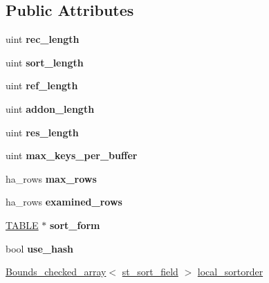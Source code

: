 \subsection*{Public Attributes}
\begin{DoxyCompactItemize}
\item 
\mbox{\label{classSort__param_a2642576c28b981c3b9ade8cbe3b7d07d}} 
uint {\bfseries rec\+\_\+length}
\item 
\mbox{\label{classSort__param_a7d595b49a79af97f33a666245dd98683}} 
uint {\bfseries sort\+\_\+length}
\item 
\mbox{\label{classSort__param_a1fa83123d9e269be4f7d8e7798087447}} 
uint {\bfseries ref\+\_\+length}
\item 
\mbox{\label{classSort__param_ae52e94af7ce910b149c9a25049d477ee}} 
uint {\bfseries addon\+\_\+length}
\item 
\mbox{\label{classSort__param_ae12b0b63f3fcd8476387cb4ce8eddd80}} 
uint {\bfseries res\+\_\+length}
\item 
\mbox{\label{classSort__param_a1f63a7f5997d4f1ac2a5d14c7b0d3ac4}} 
uint {\bfseries max\+\_\+keys\+\_\+per\+\_\+buffer}
\item 
\mbox{\label{classSort__param_af0fe74cdaa27f81d83fd2754a1a17f82}} 
ha\+\_\+rows {\bfseries max\+\_\+rows}
\item 
\mbox{\label{classSort__param_a38737496680c2ac6b0e02b66a4dd5b7a}} 
ha\+\_\+rows {\bfseries examined\+\_\+rows}
\item 
\mbox{\label{classSort__param_a02811a3c23f82a1ff349df6fb8aa24d4}} 
\mbox{\hyperlink{structTABLE}{T\+A\+B\+LE}} $\ast$ {\bfseries sort\+\_\+form}
\item 
\mbox{\label{classSort__param_af104fc0beb5436123ba9c8470d2d083e}} 
bool {\bfseries use\+\_\+hash}
\item 
\mbox{\hyperlink{classBounds__checked__array}{Bounds\+\_\+checked\+\_\+array}}$<$ \mbox{\hyperlink{structst__sort__field}{st\+\_\+sort\+\_\+field}} $>$ \mbox{\hyperlink{classSort__param_a296009bb82bee97d6bc9d24b1114e849}{local\+\_\+sortorder}}

\end{DoxyCompactItemize}

